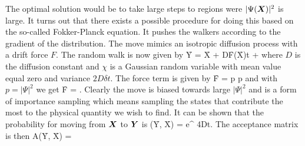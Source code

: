 The optimal solution would be to take large steps to regions were $|\Psi(\boldsymbol{X})|^2$ is large. It turns out that there exists a possible procedure for doing this based on the so-called 
Fokker-Planck equation. It pushes the walkers according to the gradient of the distribution. The move mimics an isotropic diffusion process with a drift force $F$. The random walk is now given by
\be
\f Y = \f X + D\f F(\f X)\delta t + \chi
\ee  
where $D$ is the diffusion constant and $\chi$ is a Gaussian random variable with mean value equal zero and variance $2D\delta t$. The force term is given by
\be
\f F =  p \nabla p  
\ee
and with $p=|\Psi|^2$ we get
\be
\f F =  \Psi \nabla \Psi.  
\ee
Clearly the move is biased towards large $|\Psi|^2$ and is a form of importance sampling which means sampling the states that contribute the most to the physical quantity we wish to find. It can be shown that the probability for moving from $\boldsymbol{X}$ to $\boldsymbol{Y}$ is
\be
\omega(\f Y, \f X) = e^{ {4D\delta t}}. 
\ee
The acceptance matrix is then
\be
A(\f Y, \f X) =  
\ee


